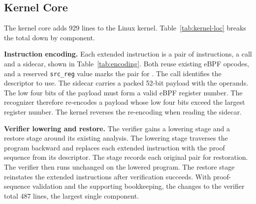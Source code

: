 \subsection{Kernel Core}
\label{subsec:kernel}

The kernel core adds 929 lines to the Linux kernel.
Table~\ref{tab:kernel-loc} breaks the total down by component.



\noindent\textbf{Instruction encoding.}
Each extended instruction is a pair of instructions, a call and a sidecar, shown in Table~\ref{tab:encoding}.
Both reuse existing eBPF opcodes, and a reserved \texttt{src\_reg} value marks the pair for \tool.
The call identifies the descriptor to use.
The sidecar carries a packed 52-bit payload with the operands.
The low four bits of the payload must form a valid eBPF register number.
The recognizer therefore re-encodes a payload whose low four bits exceed the largest register number.
The kernel reverses the re-encoding when reading the sidecar.



\noindent\textbf{Verifier lowering and restore.}
The verifier gains a lowering stage and a restore stage around its existing analysis.
The lowering stage traverses the program backward and replaces each extended instruction with the proof sequence from its descriptor.
The stage records each original pair for restoration.
The verifier then runs unchanged on the lowered program.
The restore stage reinstates the extended instructions after verification succeeds.
With proof-sequence validation and the supporting bookkeeping, the changes to the verifier total 487 lines, the largest single component.


